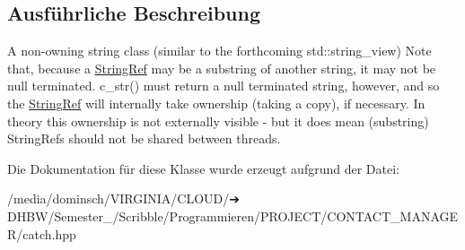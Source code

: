 \subsection{Ausführliche Beschreibung}
A non-\/owning string class (similar to the forthcoming std\+::string\+\_\+view) Note that, because a \hyperlink{classCatch_1_1StringRef}{String\+Ref} may be a substring of another string, it may not be null terminated. c\+\_\+str() must return a null terminated string, however, and so the \hyperlink{classCatch_1_1StringRef}{String\+Ref} will internally take ownership (taking a copy), if necessary. In theory this ownership is not externally visible -\/ but it does mean (substring) String\+Refs should not be shared between threads. 

Die Dokumentation für diese Klasse wurde erzeugt aufgrund der Datei\+:\begin{DoxyCompactItemize}
\item 
/media/dominsch/\+V\+I\+R\+G\+I\+N\+I\+A/\+C\+L\+O\+U\+D/➔ D\+H\+B\+W/\+Semester\+\_/\+Scribble/\+Programmieren/\+P\+R\+O\+J\+E\+C\+T/\+C\+O\+N\+T\+A\+C\+T\+\_\+\+M\+A\+N\+A\+G\+E\+R/catch.\+hpp\end{DoxyCompactItemize}
